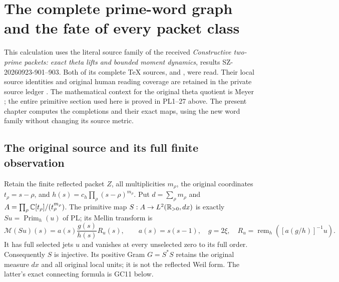 \section{The complete prime-word graph and the fate of every packet class}
\label{sec:word-graph-completion}

This calculation uses the literal source family of the received
\emph{Constructive two-prime packets: exact theta lifts and bounded
moment dynamics}, results SZ-20260923-901--903. Both of its complete
TeX sources,  and , were read.
Their local source identities and original human reading coverage
are retained in the private source ledger \cite{ConstructiveTwoPrime}. The mathematical context
for the original theta quotient is Meyer \cite{Meyer}; the entire
primitive section used here is proved in PL1--27 above. The present
chapter computes the completions and their exact maps, using the
new word family without changing its source metric.

\subsection{The original source and its full finite observation}
Retain the finite reflected packet $Z$, all multiplicities
$m_\rho$, the original coordinates $t_\rho=s-\rho$, and
$h(s)=c_h\prod_\rho(s-\rho)^{m_\rho}$. Put
$d=\sum_\rho m_\rho$ and $A=\prod_\rho\mathbb C[t_\rho]/(t_\rho^{m_\rho})$.
The primitive map $S:A\to L^2(\mathbb R_{>0},dx)$ is exactly
$S u=\operatorname{Prim}_h(u)$ of PL; its Mellin transform is
\[
 \mathcal M(Su)(s)=a(s)\frac{g(s)}{h(s)}R_u(s),\qquad
 a(s)=s(s-1),\quad g=2\xi,\quad
 R_u=\operatorname{rem}_h([a(g/h)]^{-1}u).
 \tag{GC1}\label{gc:section}
\]
It has full selected jets $u$ and vanishes at every unselected
zero to its full order. Consequently $S$ is injective. Its
positive Gram $G=S^*S$ retains the original measure $dx$ and all
original local units; it is not the reflected Weil form.
The latter's exact connecting formula is GC11 below.

